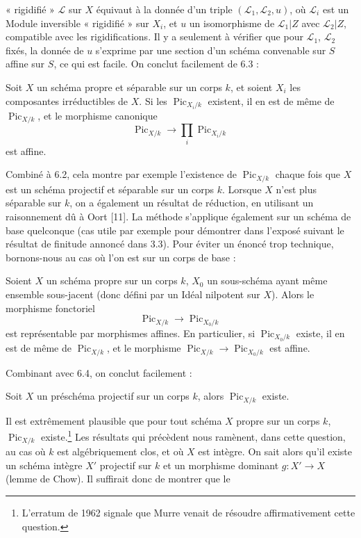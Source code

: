 « rigidifié » $\mathcal L$ sur $X$ équivaut à la donnée d'un triple
$(\mathcal L_1,\mathcal L_2,u)$, où $\mathcal L_i$ est un Module inversible
« rigidifié » sur $X_i$, et $u$ un isomorphisme de
$\mathcal L_1|Z$ avec $\mathcal L_2|Z$, compatible avec les rigidifications.
Il y a seulement à vérifier que pour $\mathcal L_1$, $\mathcal L_2$ fixés, la
donnée de $u$ s'exprime par une section d'un schéma convenable sur $S$ affine
sur $S$, ce qui est facile. On conclut facilement de 6.3 :

 Soit $X$ un schéma propre et séparable sur un corps
$k$, et soient $X_i$ les composantes irréductibles de $X$. Si les
$\operatorname{Pic}_{X_i/k}$ existent, il en est de même de
$\operatorname{Pic}_{X/k}$, et le morphisme canonique
\[
\operatorname{Pic}_{X/k}\longrightarrow\prod_i\operatorname{Pic}_{X_i/k}
\]
est affine.

Combiné à 6.2, cela montre par exemple l'existence de
$\operatorname{Pic}_{X/k}$ chaque fois que $X$ est un schéma projectif et
séparable sur un corps $k$. Lorsque $X$ n'est plus séparable sur $k$, on a
également un résultat de réduction, en utilisant un raisonnement dû à Oort
[11]. La méthode s'applique également sur un schéma de base quelconque (cas
utile par exemple pour démontrer dans l'exposé suivant le résultat de finitude
annoncé dans 3.3). Pour éviter un énoncé trop technique, bornons-nous au cas où
l'on est sur un corps de base :

 Soient $X$ un schéma propre sur un corps $k$, $X_0$
un sous-schéma ayant même ensemble sous-jacent (donc défini par un Idéal
nilpotent sur $X$). Alors le morphisme fonctoriel
\[
\operatorname{Pic}_{X/k}\longrightarrow\operatorname{Pic}_{X_0/k}
\]
est représentable par morphismes affines. En particulier, si
$\operatorname{Pic}_{X_0/k}$ existe, il en est de même de
$\operatorname{Pic}_{X/k}$, et le morphisme
$\operatorname{Pic}_{X/k}\longrightarrow\operatorname{Pic}_{X_0/k}$ est
affine.

Combinant avec 6.4, on conclut facilement :

 Soit $X$ un préschéma projectif sur un corps $k$,
alors $\operatorname{Pic}_{X/k}$ existe.

 Il est extrêmement plausible que pour tout schéma $X$
propre sur un corps $k$, $\operatorname{Pic}_{X/k}$ existe.\footnote{L'erratum
de 1962 signale que Murre venait de résoudre affirmativement cette question.}
Les résultats qui précèdent nous ramènent, dans cette question, au cas où $k$
est algébriquement clos, et où $X$ est intègre. On sait alors qu'il existe un
schéma intègre $X'$ projectif sur $k$ et un morphisme dominant
$g:X'\longrightarrow X$ (lemme de Chow). Il suffirait donc de montrer que le

